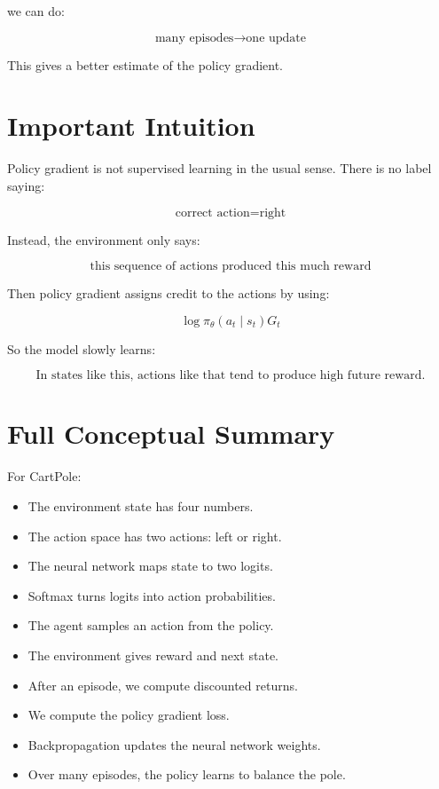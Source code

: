 \documentclass[11pt]{article}
\begin{document}
we can do:

\[
\text{many episodes} \rightarrow \text{one update}
\]

This gives a better estimate of the policy gradient.

\section{Important Intuition}

Policy gradient is not supervised learning in the usual sense.
There is no label saying:

\[
\text{correct action} = \text{right}
\]

Instead, the environment only says:

\[
\text{this sequence of actions produced this much reward}
\]

Then policy gradient assigns credit to the actions by using:

\[
\log \pi_\theta(a_t \mid s_t)G_t
\]

So the model slowly learns:

\[
\boxed{
\text{In states like this, actions like that tend to produce high future reward.}
}
\]

\section{Full Conceptual Summary}

For CartPole:

\begin{itemize}[leftmargin=2em]
    \item The environment state has four numbers.
    \item The action space has two actions: left or right.
    \item The neural network maps state to two logits.
    \item Softmax turns logits into action probabilities.
    \item The agent samples an action from the policy.
    \item The environment gives reward and next state.
    \item After an episode, we compute discounted returns.
    \item We compute the policy gradient loss.
    \item Backpropagation updates the neural network weights.
    \item Over many episodes, the policy learns to balance the pole.
\end{itemize}
\end{document}
